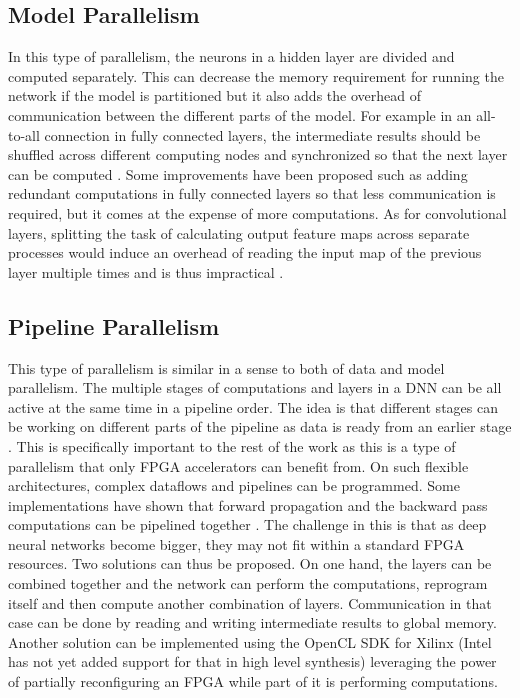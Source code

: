 \subsection{Model Parallelism}
In this type of parallelism, the neurons in a hidden layer are divided and computed separately. This can decrease the memory requirement for running the network if the model is partitioned but it also adds the overhead of communication between the different parts of the model. For example in an all-to-all connection in fully connected layers, the intermediate results should be shuffled across different computing nodes and synchronized so that the next layer can be computed \cite{deepfpga}. Some improvements have been proposed such as adding redundant computations in fully connected layers so that less communication is required\cite{muller1994neural},  but it comes at the expense of more computations. As for convolutional layers, splitting the task of calculating output feature maps across separate processes would induce an overhead of reading the input map of the previous layer multiple times and is thus impractical \cite{deepfpga}.

\subsection{Pipeline Parallelism}
This type of parallelism is similar in a sense to both of data and model parallelism. The multiple stages of computations and layers in a DNN can be all active at the same time in a pipeline order. The idea is that different stages can be working on different parts of the pipeline as data is ready from an earlier stage \cite{ddl}. This is specifically important to the rest of the work as this is a type of parallelism that only FPGA accelerators can benefit from. On such flexible architectures, complex dataflows and pipelines can be programmed. Some implementations have shown that forward propagation and the backward pass computations can be pipelined together \cite{abadi2016tensorflow, collobert2011torch7}. The challenge in this is that as deep neural networks become bigger, they may not fit within a standard FPGA resources. Two solutions can thus be proposed. On one hand, the layers can be combined together and the network can perform the computations, reprogram itself and then compute another combination of layers. Communication in that case can be done by reading and writing intermediate results to global memory. Another solution can be implemented using the OpenCL SDK for Xilinx (Intel has not yet added support for that in high level synthesis) leveraging the power of partially reconfiguring an FPGA while part of it is performing computations.
